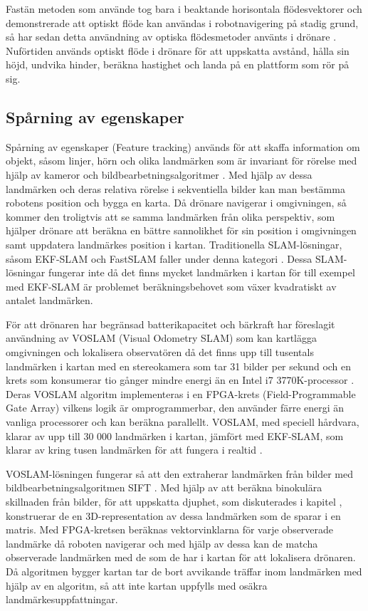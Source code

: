 Fastän metoden som \cite{341094} använde tog bara i beaktande horisontala flödesvektorer och demonstrerade att optiskt flöde kan användas i robotnavigering på stadig grund, så har sedan detta användning av optiska flödesmetoder använts i drönare \citep{6564752}. Nuförtiden används optiskt flöde i drönare för att uppskatta avstånd, hålla sin höjd, undvika hinder, beräkna hastighet och landa på en plattform som rör på sig.

\subsection{Spårning av egenskaper}

Spårning av egenskaper (Feature tracking) används för att skaffa information om objekt, såsom linjer, hörn och olika landmärken som är invariant för rörelse med hjälp av kameror och bildbearbetningsalgoritmer \citep{geospatial}. Med hjälp av dessa landmärken och deras relativa rörelse i sekventiella bilder kan man bestämma robotens position och bygga en karta. Då drönare navigerar i omgivningen, så kommer den troligtvis att se samma landmärken från olika perspektiv, som hjälper drönare att beräkna en bättre sannolikhet för sin position i omgivningen samt uppdatera landmärkes position i kartan. Traditionella SLAM-lösningar, såsom EKF-SLAM och FastSLAM faller under denna kategori \citep{voslamlatif}. Dessa SLAM-lösningar fungerar inte då det finns mycket landmärken i kartan för till exempel med EKF-SLAM är problemet beräkningsbehovet som växer kvadratiskt av antalet landmärken.

För att drönaren har begränsad batterikapacitet och bärkraft har \cite{voslam} föreslagit användning av VOSLAM (Visual Odometry SLAM) som kan kartlägga omgivningen och lokalisera observatören då det finns upp till tusentals landmärken i kartan med en stereokamera som tar 31 bilder per sekund och en krets som konsumerar tio gånger mindre energi än en Intel i7 3770K-processor \citep{voslam}. Deras VOSLAM algoritm implementeras i en FPGA-krets (Field-Programmable Gate Array) vilkens logik är omprogrammerbar, den använder färre energi än vanliga processorer och kan beräkna parallellt. VOSLAM, med speciell hårdvara, klarar av upp till 30 000 landmärken i kartan, jämfört med EKF-SLAM, som klarar av kring tusen landmärken för att fungera i realtid \citep{ProbabilisticRobotics, voslam}.

VOSLAM-lösningen fungerar så att den extraherar landmärken från bilder med bildbearbetningsalgoritmen SIFT \citep{voslam}. Med hjälp av att beräkna binokulära skillnaden från bilder, för att uppskatta djuphet, som diskuterades i kapitel , konstruerar de en 3D-representation av dessa landmärken som de sparar i en matris. Med FPGA-kretsen beräknas vektorvinklarna för varje observerade landmärke då roboten navigerar och med hjälp av dessa kan de matcha observerade landmärken med de som de har i kartan för att lokalisera drönaren. Då algoritmen bygger kartan tar de bort avvikande träffar inom landmärken med hjälp av en algoritm, så att inte kartan uppfylls med osäkra landmärkesuppfattningar.

